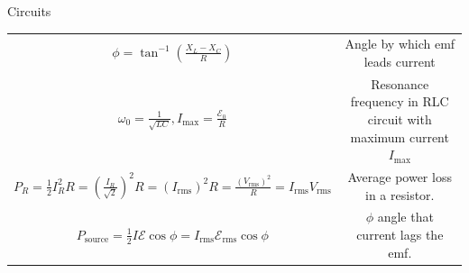 \documentclass{article}
\begin{document}
\begin{center}
\begin{section}{Circuits}
\begin{tabular}{|c|c|}
		 $\phi = \tan^{-1} \left( \frac{X_L - X_C}{R} \right)$                          & Angle by which emf leads current                  \\

		 $\omega_0 = \frac{1}{\sqrt{LC}}, I_\text{max}
		 = \frac{\mathcal E_0}{R}$                                                      & \makecell{Resonance frequency in RLC circuit      \\
		 with maximum current $I_\text{max}$ }                                                                                              \\

		 $P_R = \frac 1 2 I_R^2 R = \left( \frac{I_R}{\sqrt 2} \right)^2 R
		 = (I_\text{rms})^2 R = \frac{(V_\text{rms})^2}{R} = I_\text{rms} V_\text{rms}$ & Average power loss in a resistor.                 \\

		 $P_\text{source} = \frac 1 2 I \mathcal E \cos \phi
		 = I_\text{rms} \mathcal E_\text{rms} \cos \phi$                                & $\phi$ angle that current lags the emf.           \\



\end{tabular}
\end{section}
\end{center}
\end{document}
